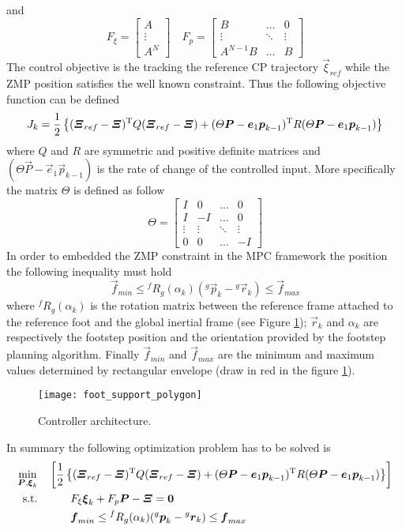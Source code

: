 and
\[
F_{\xi} =
\begin{bmatrix}
  A\\
  \vdots\\
  A^N
\end{bmatrix} \quad
F_p =
\begin{bmatrix}
  B & \hdots & 0\\
  \vdots &\ddots & \vdots\\
  A^{N-1} B & \hdots & B
\end{bmatrix}
\]
The control objective is the tracking the reference CP trajectory $\vec{\xi}_{ref}$ while the ZMP
position satisfies the well known constraint.
Thus the following objective function can be defined
\[
J_k = \frac{1}{2} \left\{  (\boldsymbol{\Xi}_{ref} - \boldsymbol{\Xi})^{\mathrm{T}} Q (\boldsymbol{\Xi}_{ref} - \boldsymbol{\Xi}) +
(\Theta \boldsymbol{P} - \boldsymbol{e}_1 \boldsymbol{p}_{k-1}) ^{\mathrm{T}} R (\Theta \boldsymbol{P} - \boldsymbol{e}_1 \boldsymbol{p}_{k-1}) \right\}
\]
where $Q$ and $R$ are symmetric and positive definite matrices and $(\Theta \vec{P} - \vec{e}_1 \vec{p}_{k-1})$ is the rate of change of the controlled input. More specifically the matrix $\Theta$ is
defined as follow
\[
\Theta =
\begin{bmatrix}
  I & 0 & \hdots & 0 \\
  I & -I & \hdots & 0 \\
  \vdots & \vdots & \ddots & \vdots \\
  0 & 0 & \hdots & -I
\end{bmatrix}
\]
In order to embedded the ZMP constraint in the MPC framework the position the following inequality
must hold
\[
\vec{f}_{min} \le {}^f R_g(\alpha_k) ({}^g \vec{p}_k - {}^ g \vec{r}_k) \le \vec{f}_{max}
\]
where ${}^f R_g(\alpha_k)$ is the rotation matrix between the reference frame attached to the
reference foot and the global inertial frame (see Figure \ref{fig:control_architecuture});
$\vec{r}_k$ and $\alpha_k$ are respectively the footstep position and the orientation provided
by the footstep planning algorithm. Finally $\vec{f}_{min}$ and $\vec{f}_{max}$ are the minimum and
maximum values determined by rectangular envelope (draw in red in the figure
\ref{fig:control_architecuture}).
\begin{figure}[!ht]
  \centering
  \texttt{[image: foot\_support\_polygon]}
  \caption{Controller architecture. \label{fig:control_architecuture}}
\end{figure}
\par
In summary the following optimization problem has to be solved is
\[
\begin{split}
  \min_{\boldsymbol{P}, \boldsymbol{\xi}_k} &  \quad \left[  \frac{1}{2}\left\{ (\boldsymbol{\Xi}_{ref} - \boldsymbol{\Xi})^{\mathrm{T}} Q (\boldsymbol{\Xi}_{ref} - \boldsymbol{\Xi}) + (\Theta \boldsymbol{P} - \boldsymbol{e}_1 \boldsymbol{p}_{k-1}) ^{\mathrm{T}} R (\Theta \boldsymbol{P} - \boldsymbol{e}_1 \boldsymbol{p}_{k-1}) \right\} \right]\\
  \text{s.t.} & \quad \quad \quad  F_{\xi} \boldsymbol{\xi}_k + F_{p} \boldsymbol{P}  - \boldsymbol{\Xi} = \boldsymbol{0}\\
  & \quad \quad \quad  \boldsymbol{f}_{min} \le {}^f R_g(\alpha_k) ({}^g \boldsymbol{p}_k - {}^ g \boldsymbol{r}_k) \le \boldsymbol{f}_{max}
\end{split}
\]
